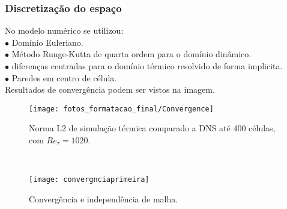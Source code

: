\documentclass[xcolor=dvipsnames,10pt,aspectratio=169]{beamer}
\begin{document}
		\begin{frame}
			\frametitle{Discretização do espaço}
			\begin{minipage}[h!]{0.39\textwidth}
      No modelo numérico se utilizou:\\
        $\bullet$ Domínio Euleriano.\\
        $\bullet$ Método Runge-Kutta de quarta ordem para o domínio dinâmico.\\
        $\bullet$ diferenças centradas para o domínio térmico resolvido de forma implicita.\\
        $\bullet$ Paredes em centro de célula.\\
      Resultados de convergência podem ser vistos na imagem.
			\end{minipage}\hfill
			\begin{minipage}[h!]{0.60\textwidth}
      \begin{figure}[!h]
        \centering
        \texttt{[image: fotos\_formatacao\_final/Convergence]}
        \caption{Norma L2 de simulação térmica comparado a DNS até 400 células, com $Re_\tau = 1020$.}
      \end{figure}

			\end{minipage}\\
		\end{frame}
	
	
	
	
	
  \begin{frame}
    \begin{figure}
      \centering
      \texttt{[image: convergnciaprimeira]}
      \caption{Convergência e independência de malha.}
      \label{convergencia}
    \end{figure}
  \end{frame}


	
	
\end{document}
